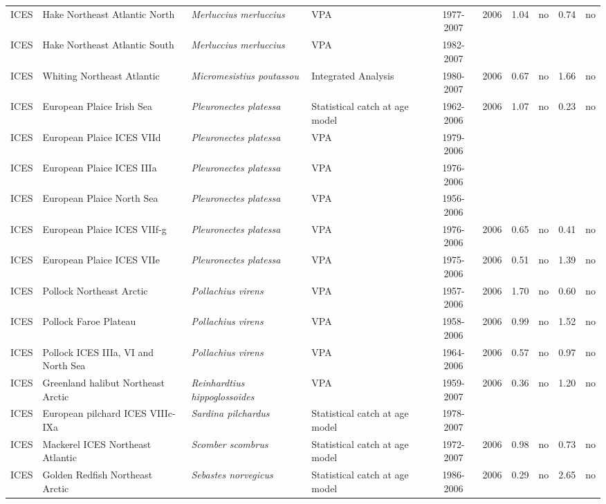 \begin{longtable}{p{1.8cm}p{3.5cm}p{3.5cm}p{3cm}cccp{0.9cm}cp{0.9cm}}
  ICES & Hake Northeast Atlantic North & \textit{Merluccius merluccius} & VPA & 1977-2007 & 2006 & 1.04 & no & 0.74 & no \\ 
  ICES & Hake Northeast Atlantic South & \textit{Merluccius merluccius} & VPA & 1982-2007 &  &  &  &  &  \\ 
  ICES & Whiting Northeast Atlantic & \textit{Micromesistius poutassou} & Integrated Analysis & 1980-2007 & 2006 & 0.67 & no & 1.66 & no \\ 
  ICES & European Plaice Irish Sea & \textit{Pleuronectes platessa} & Statistical catch at age model & 1962-2006 & 2006 & 1.07 & no & 0.23 & no \\ 
  ICES & European Plaice ICES VIId & \textit{Pleuronectes platessa} & VPA & 1979-2006 &  &  &  &  &  \\ 
  ICES & European Plaice ICES IIIa & \textit{Pleuronectes platessa} & VPA & 1976-2006 &  &  &  &  &  \\ 
  ICES & European Plaice North Sea & \textit{Pleuronectes platessa} & VPA & 1956-2006 &  &  &  &  &  \\ 
  ICES & European Plaice ICES VIIf-g & \textit{Pleuronectes platessa} & VPA & 1976-2006 & 2006 & 0.65 & no & 0.41 & no \\ 
  ICES & European Plaice ICES VIIe & \textit{Pleuronectes platessa} & VPA & 1975-2006 & 2006 & 0.51 & no & 1.39 & no \\ 
  ICES & Pollock Northeast Arctic & \textit{Pollachius virens} & VPA & 1957-2006 & 2006 & 1.70 & no & 0.60 & no \\ 
  ICES & Pollock Faroe Plateau & \textit{Pollachius virens} & VPA & 1958-2006 & 2006 & 0.99 & no & 1.52 & no \\ 
  ICES & Pollock ICES IIIa, VI and North Sea & \textit{Pollachius virens} & VPA & 1964-2006 & 2006 & 0.57 & no & 0.97 & no \\ 
  ICES & Greenland halibut Northeast Arctic & \textit{Reinhardtius hippoglossoides} & VPA & 1959-2007 & 2006 & 0.36 & no & 1.20 & no \\ 
  ICES & European pilchard ICES VIIIc-IXa & \textit{Sardina pilchardus} & Statistical catch at age model & 1978-2007 &  &  &  &  &  \\ 
  ICES & Mackerel ICES Northeast Atlantic & \textit{Scomber scombrus} & Statistical catch at age model & 1972-2007 & 2006 & 0.98 & no & 0.73 & no \\ 
  ICES & Golden Redfish Northeast Arctic & \textit{Sebastes norvegicus} & Statistical catch at age model & 1986-2006 & 2006 & 0.29 & no & 2.65 & no \\ 

\end{longtable}
